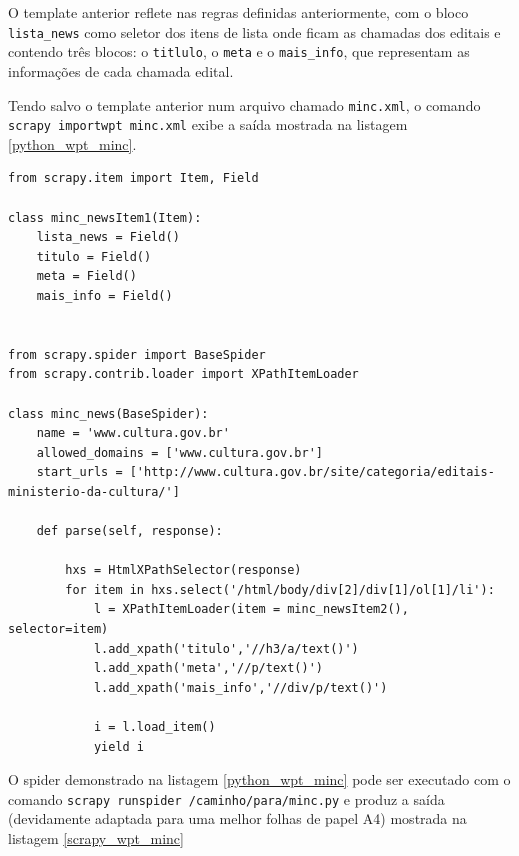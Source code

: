 O template anterior reflete nas regras definidas anteriormente, com o bloco \texttt{lista\_news} como seletor dos itens de lista onde ficam as chamadas dos editais e contendo três blocos: o \texttt{titlulo}, o \texttt{meta} e o \texttt{mais\_info}, que representam as informações de cada chamada edital.

Tendo salvo o template anterior num arquivo chamado \texttt{minc.xml}, o comando \texttt{scrapy importwpt minc.xml} exibe a saída mostrada na listagem \ref{python_wpt_minc}.

\pagebreak
{}
\begin{lstlisting}[label=python_wpt_minc]
from scrapy.item import Item, Field

class minc_newsItem1(Item):
    lista_news = Field()
    titulo = Field()
    meta = Field()
    mais_info = Field()


from scrapy.spider import BaseSpider
from scrapy.contrib.loader import XPathItemLoader

class minc_news(BaseSpider):
    name = 'www.cultura.gov.br'
    allowed_domains = ['www.cultura.gov.br']
    start_urls = ['http://www.cultura.gov.br/site/categoria/editais-ministerio-da-cultura/']

    def parse(self, response):
        
        hxs = HtmlXPathSelector(response)
        for item in hxs.select('/html/body/div[2]/div[1]/ol[1]/li'):
            l = XPathItemLoader(item = minc_newsItem2(), selector=item)
            l.add_xpath('titulo','//h3/a/text()')
            l.add_xpath('meta','//p/text()')
            l.add_xpath('mais_info','//div/p/text()')

            i = l.load_item()
            yield i

\end{lstlisting}


O spider demonstrado na listagem \ref{python_wpt_minc} pode ser executado com o comando \texttt{scrapy runspider /caminho/para/minc.py} e produz a saída (devidamente adaptada para uma melhor folhas de papel A4) mostrada na listagem \ref{scrapy_wpt_minc}

